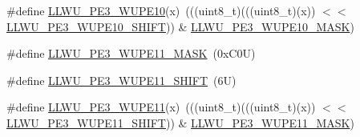 \begin{DoxyCompactItemize}
\item 
\#define \mbox{\hyperlink{group___l_l_w_u___register___masks_ga5ba778d142ba95753b9eec4e9c5e73f6}{L\+L\+W\+U\+\_\+\+P\+E3\+\_\+\+W\+U\+P\+E10}}(x)~(((uint8\+\_\+t)(((uint8\+\_\+t)(x)) $<$$<$ \mbox{\hyperlink{group___l_l_w_u___register___masks_ga1686c8515045158eeef3fc0c5df480d9}{L\+L\+W\+U\+\_\+\+P\+E3\+\_\+\+W\+U\+P\+E10\+\_\+\+S\+H\+I\+FT}})) \& \mbox{\hyperlink{group___l_l_w_u___register___masks_ga6d8e812233df26a72459712117996efa}{L\+L\+W\+U\+\_\+\+P\+E3\+\_\+\+W\+U\+P\+E10\+\_\+\+M\+A\+SK}})
\item 
\#define \mbox{\hyperlink{group___l_l_w_u___register___masks_gad46cfb926e4e6bbc0cba079fb07a2bfd}{L\+L\+W\+U\+\_\+\+P\+E3\+\_\+\+W\+U\+P\+E11\+\_\+\+M\+A\+SK}}~(0x\+C0\+U)
\item 
\#define \mbox{\hyperlink{group___l_l_w_u___register___masks_gad8a60b9eab4fe9a0c559bae94033ca1e}{L\+L\+W\+U\+\_\+\+P\+E3\+\_\+\+W\+U\+P\+E11\+\_\+\+S\+H\+I\+FT}}~(6\+U)
\item 
\#define \mbox{\hyperlink{group___l_l_w_u___register___masks_ga73485bbb713aeb9b283996279ffdea6c}{L\+L\+W\+U\+\_\+\+P\+E3\+\_\+\+W\+U\+P\+E11}}(x)~(((uint8\+\_\+t)(((uint8\+\_\+t)(x)) $<$$<$ \mbox{\hyperlink{group___l_l_w_u___register___masks_gad8a60b9eab4fe9a0c559bae94033ca1e}{L\+L\+W\+U\+\_\+\+P\+E3\+\_\+\+W\+U\+P\+E11\+\_\+\+S\+H\+I\+FT}})) \& \mbox{\hyperlink{group___l_l_w_u___register___masks_gad46cfb926e4e6bbc0cba079fb07a2bfd}{L\+L\+W\+U\+\_\+\+P\+E3\+\_\+\+W\+U\+P\+E11\+\_\+\+M\+A\+SK}})
\end{DoxyCompactItemize}
